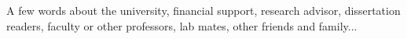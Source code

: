 \chapter*{\acknowledgments}


A few words about the university, financial support, research advisor, dissertation readers, faculty or other professors, lab mates, other friends and family...

\cleardoublepage

